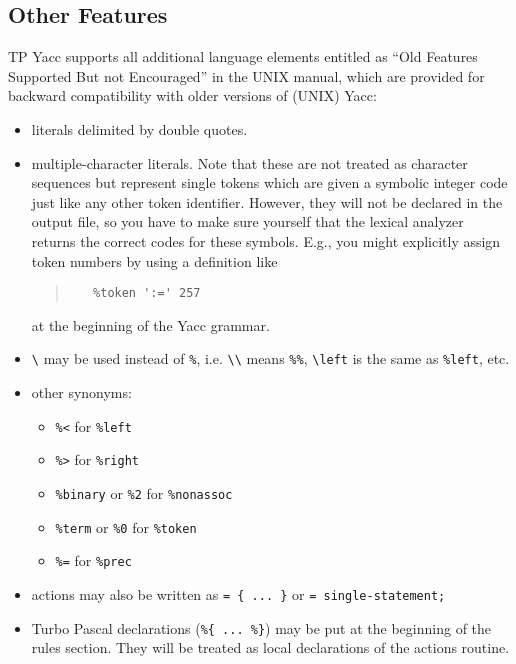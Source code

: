 \subsection{Other Features}

TP Yacc supports all additional language elements entitled as ``Old Features
Supported But not Encouraged'' in the UNIX manual, which are provided for
backward compatibility with older versions of (UNIX) Yacc:

\begin{itemize}
   \item
      literals delimited by double quotes.
   \item
      multiple-character literals. Note that these are not treated as
      character sequences but represent single tokens which are given a
      symbolic integer code just like any other token identifier. However,
      they will not be declared in the output file, so you have to make sure
      yourself that the lexical analyzer returns the correct codes for these
      symbols. E.g., you might explicitly assign token numbers by using a
      definition like
      \begin{quote}\begin{verbatim}
   %token ':=' 257
      \end{verbatim}\end{quote}
      at the beginning of the Yacc grammar.
   \item
      \verb"\" may be used instead of \verb"%", i.e. \verb"\\" means
      \verb"%%", \verb"\left" is the same as \verb"%left", etc.
   \item
      other synonyms:
      \begin{itemize}
         \item \verb"%<"                    for \verb"%left"
         \item \verb"%>"                    for \verb"%right"
         \item \verb"%binary" or \verb"%2"  for \verb"%nonassoc"
         \item \verb"%term" or \verb"%0"    for \verb"%token"
         \item \verb"%="                    for \verb"%prec"
      \end{itemize}
   \item
      actions may also be written as \verb"= { ... }" or
      \verb"= single-statement;"
   \item
      Turbo Pascal declarations (\verb"%{ ... %}") may be put at the
      beginning of the rules section. They will be treated as local
      declarations of the actions routine.
\end{itemize}

